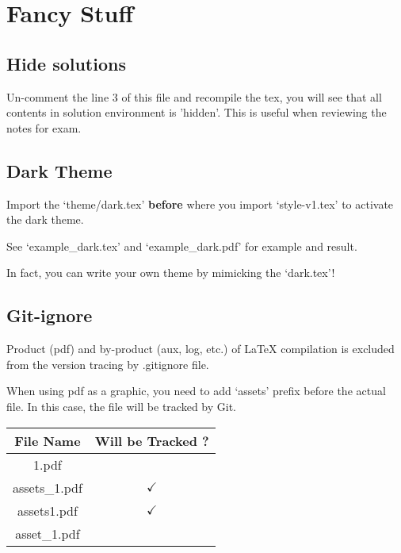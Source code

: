 \documentclass[12pt]{article}
\begin{document}
    \newpage
    \section{Fancy Stuff}
    \subsection{Hide solutions}

    Un-comment the line $3$ of this file and recompile the tex, you will see that all contents in solution environment is 'hidden'. This is useful when reviewing the notes for exam.

    \subsection{Dark Theme}

    Import the `theme/dark.tex' \textbf{before} where you import `style-v1.tex' to activate the dark theme.

    See `example\_dark.tex' and `example\_dark.pdf' for example and result.

    \begin{note}
        In fact, you can write your own theme by mimicking the `dark.tex'!
    \end{note}

    \subsection{Git-ignore}

    Product (pdf) and by-product (aux, log, etc.) of LaTeX compilation is excluded from the version tracing by .gitignore file.

    \begin{note}
        When using pdf as a graphic, you need to add `assets' prefix before the actual file. In this case, the file will be tracked by Git.

        \begin{center}
        \begin{tabular}{c | c}
            File Name & Will be Tracked ?\\
            \hline
            1.pdf   &   \\
            assets\_1.pdf & $\checkmark$\\
            assets1.pdf & $\checkmark$\\
            asset\_1.pdf & \\
        \end{tabular}
        \end{center}
    \end{note}
\end{document}
